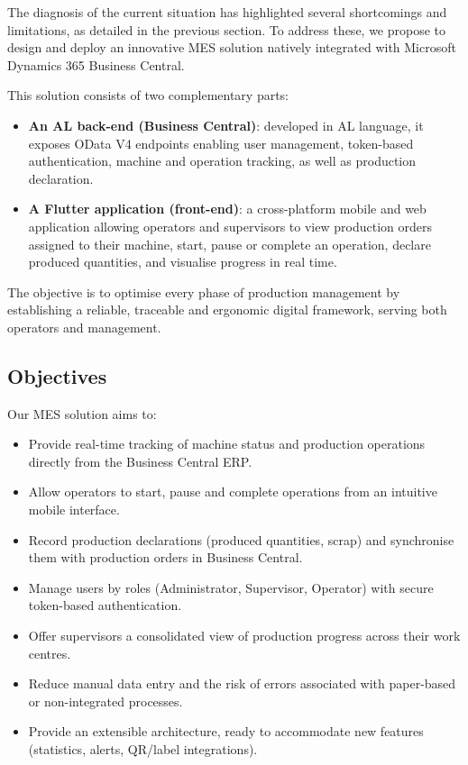 The diagnosis of the current situation has highlighted several shortcomings and
limitations, as detailed in the previous section. To address these, we propose to
design and deploy an innovative MES solution natively integrated with Microsoft
Dynamics 365 Business Central.

This solution consists of two complementary parts:

\begin{itemize}
	\item \textbf{An AL back-end (Business Central)}: developed in AL language, it
	      exposes OData V4 endpoints enabling user management, token-based authentication,
	      machine and operation tracking, as well as production declaration.
	\item \textbf{A Flutter application (front-end)}: a cross-platform mobile and web
	      application allowing operators and supervisors to view production orders assigned to
	      their machine, start, pause or complete an operation, declare produced quantities,
	      and visualise progress in real time.
\end{itemize}

The objective is to optimise every phase of production management by establishing a
reliable, traceable and ergonomic digital framework, serving both operators and
management.

\subsection{Objectives}

Our MES solution aims to:

\begin{itemize}
	\item Provide real-time tracking of machine status and production operations directly
	      from the Business Central ERP.
	\item Allow operators to start, pause and complete operations from an intuitive
	      mobile interface.
	\item Record production declarations (produced quantities, scrap) and synchronise
	      them with production orders in Business Central.
	\item Manage users by roles (Administrator, Supervisor, Operator) with secure
	      token-based authentication.
	\item Offer supervisors a consolidated view of production progress across their
	      work centres.
	\item Reduce manual data entry and the risk of errors associated with paper-based
	      or non-integrated processes.
	\item Provide an extensible architecture, ready to accommodate new features
	      (statistics, alerts, QR/label integrations).
\end{itemize}

